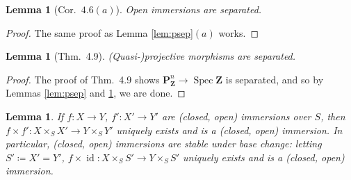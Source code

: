 \documentclass[10pt]{article}
\newtheorem{lemma}[subsubsection]{Lemma}
\theoremstyle{definition}
\theoremstyle{remark}
\numberwithin{equation}{section}
\numberwithin{figure}{subsubsection}
\DeclareMathOperator{\Spec}{Spec}
\DeclareMathOperator{\id}{id}
\begin{document}
\begin{lemma}[Cor.~$4.6(a)$]\label{separatedimm}
  Open immersions are separated.
\end{lemma}
\begin{proof}
  The same proof as Lemma \ref{lem:psep}$(a)$ works.
\end{proof}
\begin{lemma}[Thm.~4.9]\label{projsep}
  (Quasi-)projective morphisms are separated.
\end{lemma}
\begin{proof}
  The proof of Thm.~4.9 shows $\mathbf{P}^n_\mathbf{Z} \to \Spec \mathbf{Z}$ is
  separated, and so by Lemmas \ref{lem:psep} and \ref{separatedimm}, we are
  done.
\end{proof}
\begin{lemma}\label{immbasechange}
  If $f\colon X \to Y$, $f'\colon X' \to Y'$ are (closed, open) immersions over $S$, then $f \times f'\colon X \times_S X' \to Y \times_S Y'$ uniquely exists and is a (closed, open) immersion. In particular, (closed, open) immersions are stable under base change: letting $S' \coloneqq X' = Y'$, $f \times \id \colon X \times_S S'\to Y \times_S S'$ uniquely exists and is a (closed, open) immersion.
\end{lemma}
\end{document}
